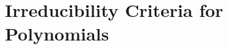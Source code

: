 \documentclass[../modern_algebra_2.tex]{subfiles}
\begin{document}
\section{Irreducibility Criteria for Polynomials}
\end{document}
